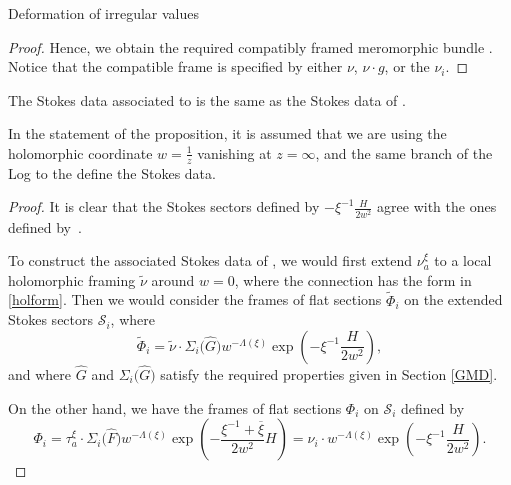 \begin{subsubsection}{Deformation of irregular values}
\begin{proof}
Hence, we obtain the required compatibly framed meromorphic bundle . Notice that the compatible frame is specified by either $\nu$, $\nu \cdot g$, or the $\nu_i$.
\end{proof}

\begin{Proposition}The Stokes data associated to  is the same as the Stokes data of .

\end{Proposition}
In the statement of the proposition, it is assumed that we are using the holomorphic coordinate $w=\frac{1}{z}$ vanishing at $z=\infty$, and the same branch of the Log to the define the Stokes data.

\begin{proof}
It is clear that the Stokes sectors defined by $-\xi^{-1}\frac{H}{2w^2}$ agree with the ones defined by~.

To construct the associated Stokes data of , we would first extend $\nu_a^{\xi}$ to a local holomorphic framing $\widetilde{\nu}$ around $w=0$, where the connection has the form in \eqref{holform}. Then we would consider the frames of flat sections $\widetilde{\Phi}_i$ on the extended Stokes sectors $\mathcal{S}_i$, where
\begin{equation*}
 \widetilde{\Phi}_i=\widetilde{\nu}\cdot \Sigma_i\bigl(\widehat{G}\bigr)w^{-\Lambda(\xi)}\exp \left(-\xi^{-1}\frac{H}{2w^2}\right),
\end{equation*}
and where $\widehat{G}$ and $\Sigma_i\bigl(\widehat{G}\bigr)$ satisfy the required properties given in Section \ref{GMD}.

On the other hand, we have the frames of flat sections $\Phi_i$ on $\mathcal{S}_i$ defined by
\begin{equation*}
 \Phi_i=\tau^{\xi}_a \cdot \Sigma_{i}\bigl(\widehat{F}\bigr)w^{-\Lambda(\xi)} \exp \left(-\frac{\xi^{-1}+\overline{\xi}}{2w^2}H\right)=\nu_{i}\cdot w^{-\Lambda(\xi)}\exp \left(-\xi^{-1}\frac{H}{2w^2}\right).
\end{equation*}


\end{proof}
\end{subsubsection}
